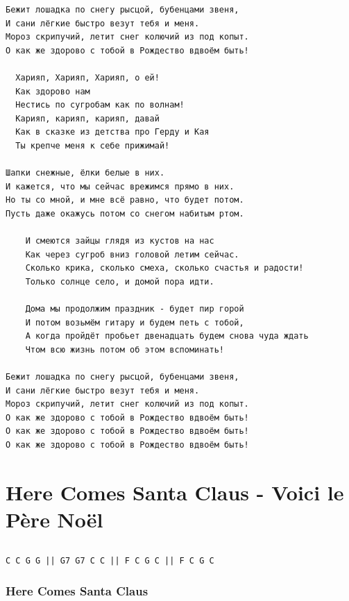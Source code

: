 \documentclass[
]{article}
\begin{document}
\begin{verbatim}
Бежит лошадка по снегу рысцой, бубенцами звеня,
И сани лёгкие быстро везут тебя и меня.
Мороз скрипучий, летит снег колючий из под копыт.
О как же здорово с тобой в Рождество вдвоём быть!

  Харияп, Харияп, Харияп, о ей!
  Как здорово нам
  Нестись по сугробам как по волнам!
  Карияп, карияп, карияп, давай
  Как в сказке из детства про Герду и Кая
  Ты крепче меня к себе прижимай!

Шапки снежные, ёлки белые в них. 
И кажется, что мы сейчас врежимся прямо в них. 
Но ты со мной, и мне всё равно, что будет потом.
Пусть даже окажусь потом со снегом набитым ртом.

    И смеются зайцы глядя из кустов на нас 
    Как через сугроб вниз головой летим сейчас.
    Сколько крика, сколько смеха, сколько счастья и радости! 
    Только солнце село, и домой пора идти.
    
    Дома мы продолжим праздник - будет пир горой 
    И потом возьмём гитару и будем петь с тобой,
    А когда пройдёт пробьет двенадцать будем снова чуда ждать 
    Чтом всю жизнь потом об этом вспоминать! 

Бежит лошадка по снегу рысцой, бубенцами звеня,
И сани лёгкие быстро везут тебя и меня.
Мороз скрипучий, летит снег колючий из под копыт.
О как же здорово с тобой в Рождество вдвоём быть!
О как же здорово с тобой в Рождество вдвоём быть!
О как же здорово с тобой в Рождество вдвоём быть!
\end{verbatim}

\hypertarget{here-comes-santa-claus---voici-le-puxe8re-nouxebl}{%
\section{Here Comes Santa Claus - Voici le Père
Noël}\label{here-comes-santa-claus---voici-le-puxe8re-nouxebl}}

\hypertarget{section-12}{%
\subsection*{}\label{section-12}}

\begin{verbatim}
C C G G || G7 G7 C C || F C G C || F C G C
\end{verbatim}

\hypertarget{here-comes-santa-claus}{%
\subsubsection*{Here Comes Santa Claus}\label{here-comes-santa-claus}}
\end{document}

